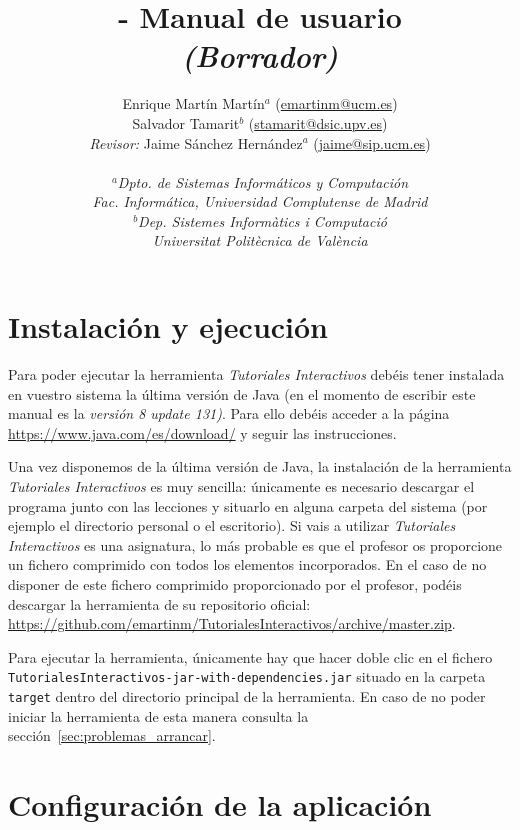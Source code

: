 \documentclass[]{article}
\title{\toolname{} - Manual de usuario \\ \emph{(Borrador)}}
\author{Enrique Martín Martín$^a$ (\url{emartinm@ucm.es}) \\ 
	Salvador Tamarit$^b$ (\url{stamarit@dsic.upv.es}) \\
	\emph{Revisor:} Jaime Sánchez Hernández$^a$ (\url{jaime@sip.ucm.es}) \\~\\[-.4cm]
	\normalsize{\emph{$^a$Dpto. de Sistemas Informáticos y Computación}}\\[-0.1cm]
	\normalsize{\emph{Fac. Informática, Universidad Complutense de Madrid}}\\[-0.1cm]
	\normalsize{\emph{$^b$Dep. Sistemes Informàtics i Computació}}\\[-0.1cm]
	\normalsize{\emph{Universitat Politècnica de València}}\\[-0.1cm]
}
\newcommand{\toolname}{\emph{Tutoriales Interactivos}}
\begin{document}
\maketitle

\tableofcontents

\clearpage

\section{Instalación y ejecución}

Para poder ejecutar la herramienta \toolname{} debéis tener instalada en vuestro sistema la última versión de Java (en el momento de escribir este manual es la \emph{versión 8 update 131)}. Para ello debéis acceder a la página \url{https://www.java.com/es/download/} y seguir las instrucciones.

Una vez disponemos de la última versión de Java, la instalación de la herramienta \toolname{} es muy sencilla: únicamente es necesario descargar el programa junto con las lecciones y situarlo en alguna carpeta del sistema (por ejemplo el directorio personal o el escritorio). Si vais a utilizar \toolname{} es una asignatura, lo más probable es que el profesor os proporcione un fichero comprimido con todos los elementos incorporados. En el caso de no disponer de este fichero comprimido proporcionado por el profesor, podéis descargar la herramienta de su repositorio oficial: \url{https://github.com/emartinm/TutorialesInteractivos/archive/master.zip}.

Para ejecutar la herramienta, únicamente hay que hacer doble clic en el fichero \texttt{TutorialesInteractivos-jar-with-dependencies.jar} situado en la carpeta \texttt{target} dentro del directorio principal de la herramienta. En caso de no poder iniciar la herramienta de esta manera consulta la sección~\ref{sec:problemas_arrancar}.

\section{Configuración de la aplicación}
\label{sec:configuracion}
\end{document}
